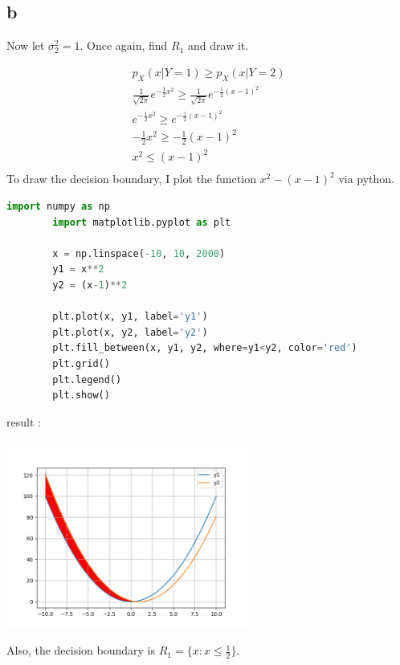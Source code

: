 \documentclass[12pt]{article}
\begin{document}
\subsection{b}
Now let $\sigma_{2}^2 = 1$. Once again, find $R_1$ and draw it.
\begin{qsolve}
    \begin{gather*}
        p_X (x|Y=1) \geq p_X(x|Y=2) \\
        \frac{1}{\sqrt{2\pi}} e^{-\frac{1}{2}x^2} \geq \frac{1}{\sqrt{2\pi}} e^{-\frac{1}{2}(x-1)^2} \\
        e^{-\frac{1}{2}x^2} \geq e^{-\frac{1}{2}(x-1)^2} \\
        -\frac{1}{2}x^2 \geq -\frac{1}{2}(x-1)^2 \\
        x^2 \leq (x-1)^2 \\
    \end{gather*}
    \splitqsolve
    To draw the decision boundary, I plot the function $x^2 - (x-1)^2$ via python.
    \begin{lstlisting}[language=Python]
        import numpy as np
        import matplotlib.pyplot as plt
        
        x = np.linspace(-10, 10, 2000)
        y1 = x**2
        y2 = (x-1)**2
        
        plt.plot(x, y1, label='y1')
        plt.plot(x, y2, label='y2')
        plt.fill_between(x, y1, y2, where=y1<y2, color='red')
        plt.grid()
        plt.legend()
        plt.show()        
    \end{lstlisting}
    result : \\ \\
    \centering
    \includegraphics[width=0.6\textwidth]{plot2.png}
    \begin{flushleft}
        Also, the decision boundary is $R_1 = \{x : x \leq \frac{1}{2}\}$.
    \end{flushleft}
\end{qsolve}
\end{document}
